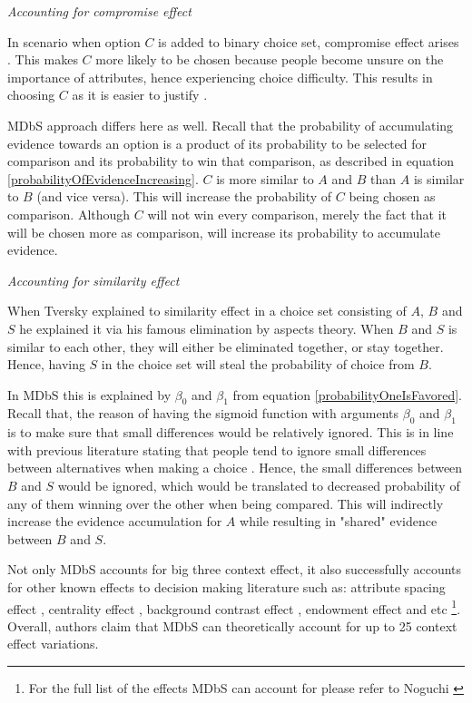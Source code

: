 \documentclass[a4paper,12pt]{article}
\newcommand{\citeyearonly}[1]{\citeyearpar{#1}}
\begin{document}
\textit{Accounting for compromise effect}

In scenario when option $C$ is added to binary choice set, compromise effect arises \citep{simonson89}. This makes $C$ more likely to be chosen because people become unsure on the importance of attributes, hence experiencing choice difficulty. This results in choosing $C$ as it is easier to justify \citep{simonson89}. 

MDbS approach differs here as well. Recall that the probability of accumulating evidence towards an option is a product of its probability to be selected for comparison and its probability to win that comparison, as described in equation \ref{probabilityOfEvidenceIncreasing}. $C$ is more similar to $A$ and $B$ than $A$ is similar to $B$ (and vice versa). This will increase the probability of $C$ being chosen as comparison. Although $C$ will not win every comparison, merely the fact that it will be chosen more as comparison, will increase its probability to accumulate evidence.

\textit{Accounting for similarity effect}

When Tversky \citeyearonly{tversky1972elimination} explained to similarity effect in a choice set consisting of $A$, $B$ and $S$ he explained it via his famous elimination by aspects theory. When $B$ and $S$ is similar to each other, they will either be eliminated together, or stay together. Hence, having $S$ in the choice set will steal the probability of choice from $B$.

In MDbS this is explained by $\beta_0$ and $\beta_1$ from equation \ref{probabilityOneIsFavored}. Recall that, the reason of having the sigmoid function with arguments $\beta_0$ and $\beta_1$ is to make sure that small differences would be relatively ignored. This is in line with previous literature stating that people tend to ignore small differences between alternatives when making a choice \citep{kalwani1992consumer}. Hence, the small differences between $B$ and $S$ would be ignored, which would be translated to decreased probability of any of them winning over the other when being compared. This will indirectly increase the evidence accumulation for $A$ while resulting in "shared" evidence between $B$ and $S$.

Not only MDbS accounts for big three context effect, it also successfully accounts for other known effects to decision making literature such as: attribute spacing effect \citep{cooke1998multiattribute}, centrality effect \citep{brown2011decision}, background contrast effect \citep{tverskySimonson93}, endowment effect \citep{knetsch1989endowment} and etc \footnote{For the full list of the effects MDbS can account for please refer to Noguchi \citeyearonly{noguchi2018multialternative}}. Overall, authors claim that MDbS can theoretically account for up to 25 context effect variations. 
\end{document}
